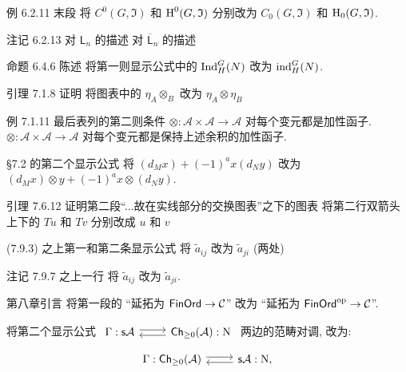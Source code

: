 \documentclass{AJerrata}
\begin{document}
\begin{Errata}
		\item[例 6.2.11 末段]
		将 $C^0(G, \mathfrak{I})$ 和 $\operatorname{H}^0(G, \mathfrak{I})$ 分别改为 $C_0(G, \mathfrak{I})$ 和 $\operatorname{H}_0(G, \mathfrak{I})$.
		
		\item[注记 6.2.13]
		\Orig 对 $\mathsf{L}_n$ 的描述
		\Corr 对 $\overline{\mathsf{L}}_n$ 的描述
		
		\item[命题 6.4.6 陈述]
		将第一则显示公式中的 $\operatorname{Ind}^G_H(N)$ 改为 $\operatorname{ind}^G_H(N)$.
		
		\item[引理 7.1.8 证明]
		将图表中的 $\eta_A \otimes_B$ 改为 $\eta_A \otimes \eta_B$
		
		\item[例 7.1.11 最后表列的第二则条件]
		\Orig $\otimes: \mathcal{A} \times \mathcal{A} \to \mathcal{A}$ 对每个变元都是加性函子.
		\Corr $\otimes: \mathcal{A} \times \mathcal{A} \to \mathcal{A}$ 对每个变元都是保持上述余积的加性函子.
		
		\item[\S 7.2 的第二个显示公式]
		将 $(d_M x) + (-1)^a x (d_N y)$ 改为 $(d_M x) \otimes y + (-1)^a x \otimes (d_N y)$.
		
		\item[引理 7.6.12 证明第二段``...故在实线部分的交换图表''之下的图表]
		将第二行双箭头上下的 $Tu$ 和 $Tv$ 分别改成 $u$ 和 $v$
		
		\item[(7.9.3) 之上第一和第二条显示公式]
		将 $\tilde{a}_{ij}$ 改为 $\tilde{a}_{ji}$ (两处)
		
		\item[注记 7.9.7 之上一行]
		将 $\tilde{a}_{ij}$ 改为 $\tilde{a}_{ji}$.
		
		\item[第八章引言]
		将第一段的 ``延拓为 $\mathsf{FinOrd} \to \mathcal{C}$'' 改为 ``延拓为 $\mathsf{FinOrd}^{\operatorname{op}} \to \mathcal{C}$''.
		
		将第二个显示公式
		$\begin{tikzcd}
			\Gamma: \cate{s}\mathcal{A} \arrow[shift left, r] & \cate{Ch}_{\geq 0}(\mathcal{A}): \mathrm{N} \arrow[shift left, l]
		\end{tikzcd}$
		两边的范畴对调, 改为:
		\[\begin{tikzcd}
			\Gamma: \cate{Ch}_{\geq 0}(\mathcal{A}) \arrow[shift left, r] & \cate{s}\mathcal{A}: \mathrm{N}, \arrow[shift left, l]
		\end{tikzcd}\]
		

\end{Errata}
\end{document}
